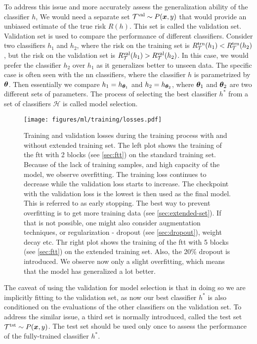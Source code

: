 To address this issue and more accurately assess the generalization ability of the classifier $h$, We would need a
separate set $\mathcal{T}^\text{val} \sim P(\bm{x}, y)$ that would provide an unbiased estimate of the true risk $R(h)$. This set is
called the validation set. Validation set is used to compare the performance of different
classifiers. Consider two classifiers $h_1$ and $h_2$, where the risk on the training set is $R_\mathcal{T}^\text{trn}(h_1) <
    R_\mathcal{T}^\text{trn}(h_2)$, but the risk on the validation set is $R_\mathcal{T}^\text{val}(h_1) > R_\mathcal{T}^\text{val}(h_2)$. In this case, we would prefer the
classifier $h_2$ over $h_1$ as it generalizes better to unseen data. The specific case is often seen with the \gls{nn}
classifiers, where the classifier $h$ is parametrized by ${\boldsymbol{\theta}}$. Then essentially we compare $h_1 = h_{{\boldsymbol{\theta}}_1}$ and
$h_2 = h_{{\boldsymbol{\theta}}_2}$, where ${\boldsymbol{\theta}}_1$ and ${\boldsymbol{\theta}}_2$ are two different sets of parameters. The process of selecting
the best classifier $h^*$ from a set of classifiers $\mathcal{H}$ is called model selection.

\begin{figure}[htb]
    \centering
    \texttt{[image: figures/ml/training/losses.pdf]}
    \caption[Training and validation losses during the training process with and without extended training set.]
    {Training and validation losses during the training process with and without extended training set.
        The left plot shows the training of the \acrshort{ftt} with 2 blocks (see \autoref{sec:ftt}) on the
        standard training set. Because of the lack of training samples, and high capacity of the model, we observe
        overfitting. The training loss continues to decrease while the validation loss starts to increase. The
        checkpoint with the validation loss is the lowest is then used as the final model. This is referred to as early
        stopping. The best way to prevent overfitting is to get more training data (see
        \autoref{sec:extended-set}). If that is not possible, one might also consider augmentation techniques, or
        regularization - dropout (see \autoref{sec:dropout}), weight decay etc. Thr right plot shows the
        training of the \acrshort{ftt} with 5 blocks (see \autoref{sec:ftt}) on the extended training set. Also, the 20\%
        dropout is introduced. We observe now only a slight overfitting, which means that the model has generalized
        a lot better.}
    \label{fig:losses}
\end{figure}

The caveat of using the validation for model selection is that in doing so we are implicitly fitting to the validation set,
as now our best classifier $h^*$ is also conditioned on the evaluations of the other classifiers on the validation set.
To address the similar issue, a third set is normally introduced, called the test set $\mathcal{T}^\text{tst} \sim P(\bm{x}, y)$. The test
set should be used only once to assess the performance of the fully-trained classifier $h^*$.




